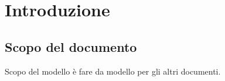 \tableofcontents

\chapter{Introduzione}
\thispagestyle{fancy} %

\section{Scopo del documento}
Scopo del modello \`e fare da modello per gli altri documenti.





